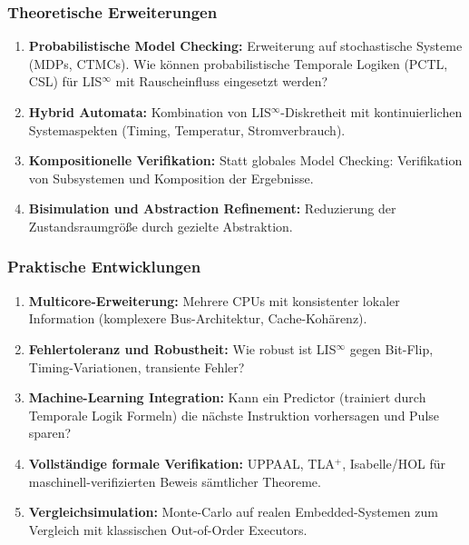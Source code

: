 \documentclass[a4paper,12pt]{article}
\theoremstyle{definition}
\begin{document}
	\subsubsection{Theoretische Erweiterungen}
	
	\begin{enumerate}
		\item \textbf{Probabilistische Model Checking:} Erweiterung auf stochastische Systeme (MDPs, CTMCs). Wie können probabilistische Temporale Logiken (PCTL, CSL) für LIS$^{\infty}$ mit Rauscheinfluss eingesetzt werden?
		
		\item \textbf{Hybrid Automata:} Kombination von LIS$^{\infty}$-Diskretheit mit kontinuierlichen Systemaspekten (Timing, Temperatur, Stromverbrauch).
		
		\item \textbf{Kompositionelle Verifikation:} Statt globales Model Checking: Verifikation von Subsystemen und Komposition der Ergebnisse.
		
		\item \textbf{Bisimulation und Abstraction Refinement:} Reduzierung der Zustandsraumgröße durch gezielte Abstraktion.
	\end{enumerate}
	
	\subsubsection{Praktische Entwicklungen}
	
	\begin{enumerate}
		\item \textbf{Multicore-Erweiterung:} Mehrere CPUs mit konsistenter lokaler Information (komplexere Bus-Architektur, Cache-Kohärenz).
		
		\item \textbf{Fehlertoleranz und Robustheit:} Wie robust ist LIS$^{\infty}$ gegen Bit-Flip, Timing-Variationen, transiente Fehler?
		
		\item \textbf{Machine-Learning Integration:} Kann ein Predictor (trainiert durch Temporale Logik Formeln) die nächste Instruktion vorhersagen und Pulse sparen?
		
		\item \textbf{Vollständige formale Verifikation:} UPPAAL, TLA$^+$, Isabelle/HOL für maschinell-verifizierten Beweis sämtlicher Theoreme.
		
		\item \textbf{Vergleichsimulation:} Monte-Carlo auf realen Embedded-Systemen zum Vergleich mit klassischen Out-of-Order Executors.
	\end{enumerate}
	
\end{document}

